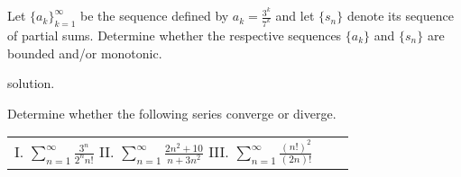 \documentclass[handout]{ximera}
\begin{document}
\begin{problem}
Let $\{a_k\}_{k=1}^\infty$ be the sequence defined by $a_k = \frac{3^k}{7^k}$ and let $\{s_n\}$ denote its sequence of partial sums. Determine whether the respective sequences $\{a_k\}$ and $\{s_n\}$ are bounded and/or monotonic.
\end{problem}

\begin{freeResponse}
solution.
\end{freeResponse}

\begin{problem}
Determine whether the following series converge or diverge.
\begin{center}
\begin{tabular}{lll}
I. $\sum_{n=1}^\infty \frac{3^n}{2^n n!}$ \hspace{.3in} II. $\sum_{n=1}^\infty \frac{2n^2+10}{n+3n^2}$ \hspace{.3in} III. $\sum_{n=1}^\infty \frac{(n!)^2}{(2n)!}$
\end{tabular}
\end{center}
\end{problem}
\end{document}
